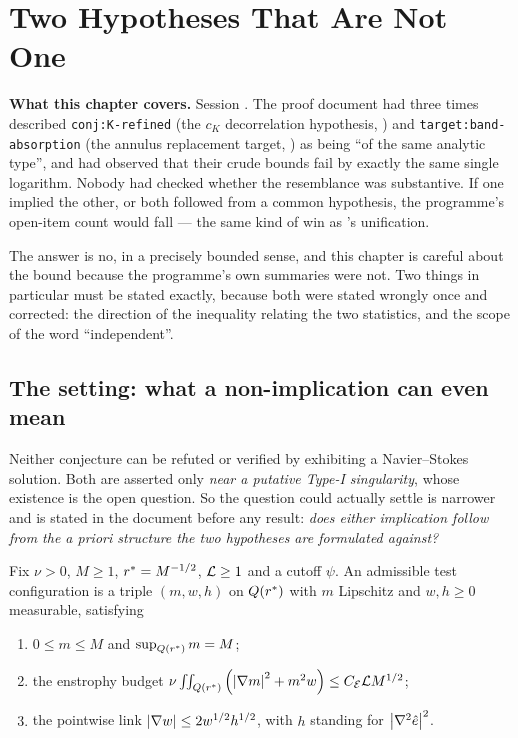 \chapter{Two Hypotheses That Are Not One}
\label{ch:non-implication}

\begin{record}
\textbf{What this chapter covers.} Session . The proof document had
three times described \texttt{conj:K-refined} (the \(c_K\) decorrelation
hypothesis, ) and \texttt{target:band-absorption} (the annulus
replacement target, ) as being ``of the same analytic type'', and had
observed that their crude bounds fail by exactly the same single logarithm.
Nobody had checked whether the resemblance was substantive. If one implied the
other, or both followed from a common hypothesis, the programme's open-item
count would fall --- the same kind of win as 's unification.

\smallskip
The answer is no, in a precisely bounded sense, and this chapter is careful
about the bound because the programme's own summaries were not. Two things in
particular must be stated exactly, because both were stated wrongly once and
corrected: the direction of the inequality relating the two statistics, and
the scope of the word ``independent''.
\end{record}

\section{The setting: what a non-implication can even mean}
\label{sec:s44-setting}

Neither conjecture can be refuted or verified by exhibiting a Navier--Stokes
solution. Both are asserted only \emph{near a putative Type-I singularity},
whose existence is the open question. So the question  could actually
settle is narrower and is stated in the document before any result:
\emph{does either implication follow from the a priori structure the two
hypotheses are formulated against?}

\begin{defn}
\label{def:s44config}
Fix \(\nu>0\), \(M\ge1\), \(r^{*}=M^{-1/2}\), \(\mathcal{L}\ge1\) and a cutoff
\(\psi\). An admissible test configuration is a triple \((m,w,h)\) on
\(Q(r^{*})\) with \(m\) Lipschitz and \(w,h\ge0\) measurable, satisfying
\begin{enumerate}[label=\textup{(A\arabic*)},leftmargin=2.6em]
\item \(0\le m\le M\) and \(\sup_{Q(r^{*})}m=M\);
\item the enstrophy budget
  \(\nu\iint_{Q(r^{*})}\left(\left|\nabla m\right|^2+m^2w\right)\le C_{\mathcal E}\mathcal{L} M^{1/2}\);
\item the pointwise link \(\left|\nabla w\right|\le2w^{1/2}h^{1/2}\), with \(h\)
  standing for \(\left|\nabla^2\hat{e}\right|^2\).
\end{enumerate}
\end{defn}

